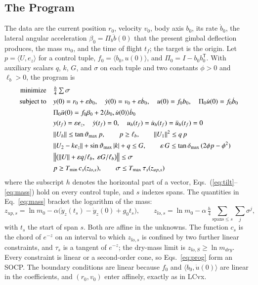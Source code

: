 \documentclass[10pt,letterpaper]{article}
\theoremstyle{aiaa}
\newcommand{\norm}[1]{\lVert #1\rVert}
\newcommand{\ip}[2]{\langle #1,#2\rangle}
\newcommand{\ez}{e_z}
\newcommand{\Pib}{\Pi_b}
\newcommand{\Tmin}{T_{\min}}
\newcommand{\Tmax}{T_{\max}}
\newcommand{\dmax}{\delta_{\max}}
\newcommand{\thmax}{\vartheta_{\max}}
\begin{document}
\subsection{The Program}
The data are the current position $r_0$, velocity $v_0$, body axis $b_0$, its rate $\dot b_0$, the lateral angular acceleration
$\beta_0=\Pib\ddot b(0)$ that the present gimbal deflection produces, the mass $m_0$, and the time of flight $t_f$; the target is
the origin. Let $p=\ip U\ez$ for a control tuple, $f_0=\ip{b_0}{u(0)}$, and $\Pi_0=I-b_0b_0^{\mathsf T}$. With auxiliary scalars
$q$, $k$, $G$, and $\sigma$ on each tuple and two constants $\phi>0$ and $\ell_b>0$, the program is
\begin{subequations}\label{eq:prog}
\begin{align}
\text{minimize}\quad & \tfrac h4\textstyle\sum\sigma \label{eq:obj}\\
\text{subject to}\quad & y(0)=r_0+\varepsilon b_0,\quad \dot y(0)=v_0+\varepsilon\dot b_0,\quad u(0)=f_0b_0,\quad \Pi_0\dot u(0)=f_0\dot b_0 \notag\\
& \Pi_0\ddot u(0)=f_0\beta_0+2\ip{b_0}{\dot u(0)}\dot b_0 \label{eq:bc0}\\
& y(t_f)=\varepsilon\ez,\quad \dot y(t_f)=0,\quad u_h(t_f)=\dot u_h(t_f)=\ddot u_h(t_f)=0 \label{eq:bcf}\\
& \norm{U_h}\le\tan\thmax\,p,\qquad p\ge\ell_b,\qquad \norm{U_1}^2\le q\,p \label{eq:tilt}\\
& \norm{U_2-k\ez}+\sin\thmax\,|k|+q\le G,\qquad \varepsilon\,G\le\tan\dmax\,(2\phi p-\phi^2) \label{eq:gimbal}\\
& \bigl\|\bigl(\norm U+\varepsilon q/\ell_b,\ \varepsilon G/\ell_b\bigr)\bigr\|\le\sigma \label{eq:sigma}\\
& p\ge\Tmin\,c_s(z_{lo,s}),\qquad \sigma\le\Tmax\,\tau_s(z_{up,s}) \label{eq:mass}
\end{align}
\end{subequations}
where the subscript $h$ denotes the horizontal part of a vector, Eqs.~(\ref{eq:tilt}--\ref{eq:mass}) hold on every control
tuple, and $s$ indexes spans. The quantities in Eq.~\eqref{eq:mass} bracket the logarithm of the mass:
\begin{equation}\label{eq:z}
z_{up,s}=\ln m_0-\alpha\bigl(\dot y_z(t_s)-\dot y_z(0)+g_0t_s\bigr),\qquad z_{lo,s}=\ln m_0-\alpha\,\tfrac h4\!\!\sum_{\text{spans}\le s}\sum_{j}\sigma^j ,
\end{equation}
with $t_s$ the start of span $s$. Both are affine in the unknowns. The function $c_s$ is the chord of $e^{-z}$ on an interval
to which $z_{lo,s}$ is confined by two further linear constraints, and $\tau_s$ is a tangent of $e^{-z}$; the dry-mass limit is
$z_{lo,S}\ge\ln m_{dry}$. Every constraint is linear or a second-order cone, so Eqs.~\eqref{eq:prog} form an SOCP. The boundary
conditions are linear because $f_0$ and $\ip{b_0}{\dot u(0)}$ are linear in the coefficients, and $(r_0,v_0)$ enter affinely,
exactly as in LCvx.
\end{document}
